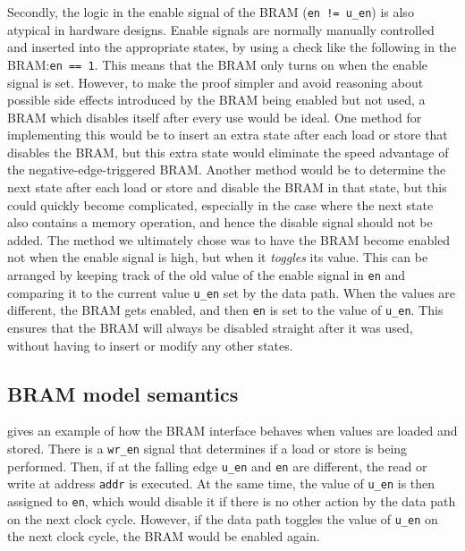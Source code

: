 Secondly, the logic in the enable signal of the \gls{BRAM} (\texttt{en != u\_en}) is
also atypical in hardware designs.  Enable signals are normally manually
controlled and inserted into the appropriate states, by using a check like the
following in the \gls{BRAM}:\@ \texttt{en == 1}.  This means that the \gls{BRAM} only turns on
when the enable signal is set.  However, to make the proof simpler and avoid
reasoning about possible side effects introduced by the \gls{BRAM} being enabled but
not used, a \gls{BRAM} which disables itself after every use would be ideal.  One
method for implementing this would be to insert an extra state after each load
or store that disables the \gls{BRAM}, but this extra state would eliminate the speed
advantage of the negative-edge-triggered \gls{BRAM}. Another method would be to
determine the next state after each load or store and disable the \gls{BRAM} in that
state, but this could quickly become complicated, especially in the case where
the next state also contains a memory operation, and hence the disable signal
should not be added. The method we ultimately chose was to have the \gls{BRAM} become
enabled not when the enable signal is high, but when it \emph{toggles} its
value.  This can be arranged by keeping track of the old value of the enable
signal in \texttt{en} and comparing it to the current value \texttt{u\_en} set
by the data path.  When the values are different, the \gls{BRAM} gets enabled, and then
\texttt{en} is set to the value of \texttt{u\_en}. This ensures that the \gls{BRAM}
will always be disabled straight after it was used, without having to insert or
modify any other states.


\subsection{BRAM model semantics}%
\label{sec:hg:bram-model-semantics}

 gives an example of how the \gls{BRAM} interface
behaves when values are loaded and stored.  There is a \texttt{wr\_en} signal
that determines if a load or store is being performed.  Then, if at the falling
edge \texttt{u\_en} and \texttt{en} are different, the read or write at address
\texttt{addr} is executed.  At the same time, the value of \texttt{u\_en} is
then assigned to \texttt{en}, which would disable it if there is no other action
by the data path on the next clock cycle.  However, if the data path toggles the
value of \texttt{u\_en} on the next clock cycle, the \gls{BRAM} would be enabled
again.

